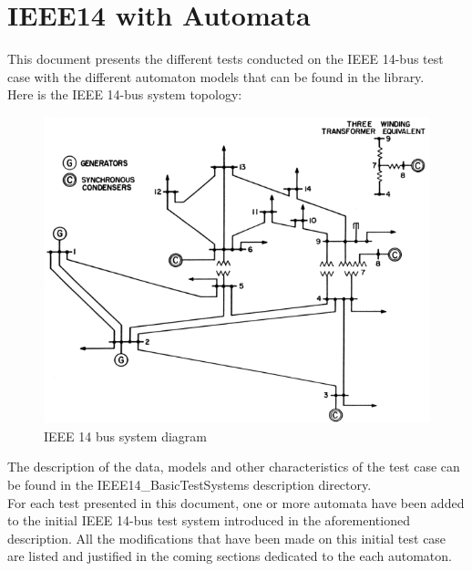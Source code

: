 \documentclass[a4paper, 12pt]{report}
\begin{document}
\chapter{IEEE14 with Automata}

This document presents the different tests conducted on the IEEE 14-bus test case with the different automaton models that can be found in the \Dynawo library.\\

Here is the IEEE 14-bus system topology:
\begin{figure}[H]
  \includegraphics[width=\textwidth]{Single-line-diagram-of-IEEE-14-bus-system.png}
  \caption{IEEE 14 bus system diagram}
\end{figure}

The description of the data, models and other characteristics of the test case can be found in the IEEE14\_BasicTestSystems description directory. \\

For each test presented in this document, one or more automata have been added to the initial IEEE 14-bus test system introduced in the aforementioned description. All the modifications that have been made on this initial test case are listed and justified in the coming sections dedicated to the each automaton.\\
\end{document}
